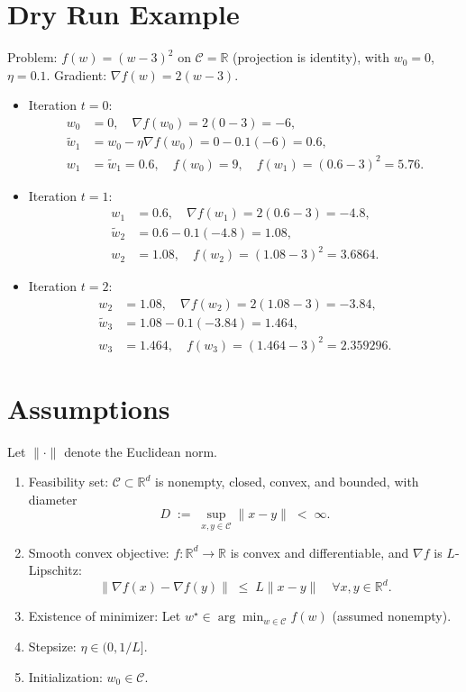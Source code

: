 \documentclass[11pt]{article}
\begin{document}
\section*{Dry Run Example}
Problem: $f(w)=(w-3)^2$ on $\mathcal{C}=\mathbb{R}$ (projection is identity), with $w_0=0$, $\eta=0.1$. Gradient: $\nabla f(w)=2(w-3)$.
\begin{itemize}
\item Iteration $t=0$:
\begin{align*}
w_0 &= 0,\quad \nabla f(w_0)=2(0-3)=-6,\\
\tilde{w}_{1} &= w_0 - \eta \nabla f(w_0) = 0 - 0.1(-6) = 0.6,\\
w_1 &= \tilde{w}_{1} = 0.6,\quad f(w_0)=9,\quad f(w_1)=(0.6-3)^2=5.76.
\end{align*}
\item Iteration $t=1$:
\begin{align*}
w_1 &= 0.6,\quad \nabla f(w_1)=2(0.6-3)=-4.8,\\
\tilde{w}_{2} &= 0.6 - 0.1(-4.8) = 1.08,\\
w_2 &= 1.08,\quad f(w_2)=(1.08-3)^2=3.6864.
\end{align*}
\item Iteration $t=2$:
\begin{align*}
w_2 &= 1.08,\quad \nabla f(w_2)=2(1.08-3)=-3.84,\\
\tilde{w}_{3} &= 1.08 - 0.1(-3.84) = 1.464,\\
w_3 &= 1.464,\quad f(w_3)=(1.464-3)^2=2.359296.
\end{align*}
\end{itemize}

\section*{Assumptions}
Let $\|\cdot\|$ denote the Euclidean norm.
\begin{enumerate}
\item Feasibility set: $\mathcal{C}\subset\mathbb{R}^d$ is nonempty, closed, convex, and bounded, with diameter
\[
D \;:=\; \sup_{x,y\in\mathcal{C}} \|x-y\| \;<\; \infty.
\]
\item Smooth convex objective: $f:\mathbb{R}^d\to\mathbb{R}$ is convex and differentiable, and $\nabla f$ is $L$-Lipschitz:
\[
\|\nabla f(x)-\nabla f(y)\|\;\le\; L\|x-y\|\quad\forall x,y\in\mathbb{R}^d.
\]
\item Existence of minimizer: Let $w^\star \in \arg\min_{w\in\mathcal{C}} f(w)$ (assumed nonempty).
\item Stepsize: $\eta\in (0,1/L]$.
\item Initialization: $w_0\in\mathcal{C}$.
\end{enumerate}
\end{document}
